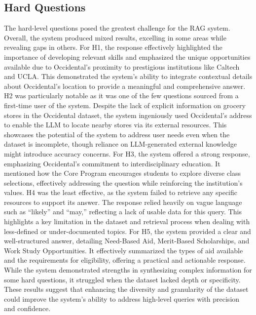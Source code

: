 \documentclass[10pt,twocolumn]{article}
\begin{document}
\subsection{Hard Questions}
The hard-level questions posed the greatest challenge for the RAG system. Overall, the system produced mixed results, excelling in some areas while revealing gaps in others. For H1, the response effectively highlighted the importance of developing relevant skills and emphasized the unique opportunities available due to Occidental’s proximity to prestigious institutions like Caltech and UCLA. This demonstrated the system’s ability to integrate contextual details about Occidental’s location to provide a meaningful and comprehensive answer. H2 was particularly notable as it was one of the few questions sourced from a first-time user of the system. Despite the lack of explicit information on grocery stores in the Occidental dataset, the system ingeniously used Occidental’s address to enable the LLM to locate nearby stores via its external resources. This showcases the potential of the system to address user needs even when the dataset is incomplete, though reliance on LLM-generated external knowledge might introduce accuracy concerns. For H3, the system offered a strong response, emphasizing Occidental’s commitment to interdisciplinary education. It mentioned how the Core Program encourages students to explore diverse class selections, effectively addressing the question while reinforcing the institution’s values. H4 was the least effective, as the system failed to retrieve any specific resources to support its answer. The response relied heavily on vague language such as “likely” and “may,” reflecting a lack of usable data for this query. This highlights a key limitation in the dataset and retrieval process when dealing with less-defined or under-documented topics. For H5, the system provided a clear and well-structured answer, detailing Need-Based Aid, Merit-Based Scholarships, and Work Study Opportunities. It effectively summarized the types of aid available and the requirements for eligibility, offering a practical and actionable response. While the system demonstrated strengths in synthesizing complex information for some hard questions, it struggled when the dataset lacked depth or specificity. These results suggest that enhancing the diversity and granularity of the dataset could improve the system’s ability to address high-level queries with precision and confidence.
\end{document}
